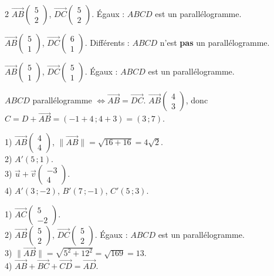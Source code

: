 \begin{multicols}{2}
$\vec{AB}\begin{pmatrix}5\\2\end{pmatrix}$, $\vec{DC}\begin{pmatrix}5\\2\end{pmatrix}$.
Égaux : $ABCD$ est un parallélogramme.

$\vec{AB}\begin{pmatrix}5\\1\end{pmatrix}$, $\vec{DC}\begin{pmatrix}6\\1\end{pmatrix}$.
Différents : $ABCD$ n'est \textbf{pas} un parallélogramme.

$\vec{AB}\begin{pmatrix}5\\1\end{pmatrix}$, $\vec{DC}\begin{pmatrix}5\\1\end{pmatrix}$.
Égaux : $ABCD$ est un parallélogramme.

$ABCD$ parallélogramme $\iff\vec{AB}=\vec{DC}$. $\vec{AB}\begin{pmatrix}4\\3\end{pmatrix}$,
donc $C=D+\vec{AB}=(-1+4\,;4+3)=(3\,;7)$.

1) $\vec{AB}\begin{pmatrix}4\\4\end{pmatrix}$, $\|\vec{AB}\|=\sqrt{16+16}=4\sqrt2$.\\
2) $A'(5\,;1)$.\\
3) $\vec u+\vec v\begin{pmatrix}-3\\4\end{pmatrix}$.\\
4) $A'(3\,;-2)$, $B'(7\,;-1)$, $C'(5\,;3)$.

1) $\vec{AC}\begin{pmatrix}5\\-2\end{pmatrix}$.\\
2) $\vec{AB}\begin{pmatrix}5\\2\end{pmatrix}$, $\vec{DC}\begin{pmatrix}5\\2\end{pmatrix}$.
Égaux : $ABCD$ est un parallélogramme.\\
3) $\|\vec{AB}\|=\sqrt{5^{2}+12^{2}}=\sqrt{169}=13$.\\
4) $\vec{AB}+\vec{BC}+\vec{CD}=\vec{AD}$.


\end{multicols}
